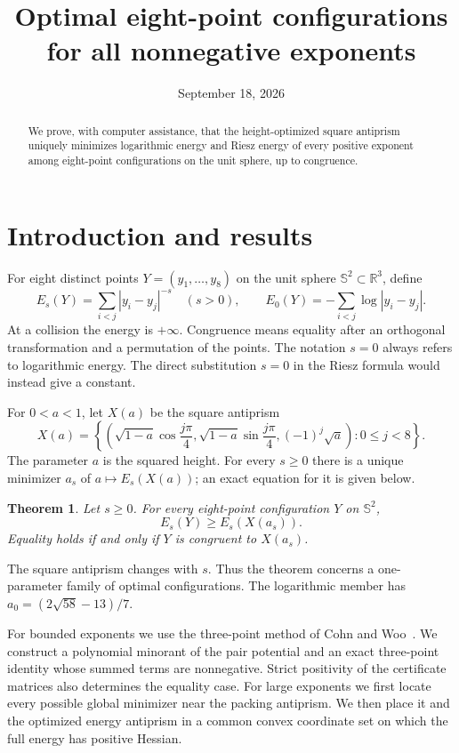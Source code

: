 \documentclass[12pt,reqno]{amsart}
\title[Optimal eight-point configurations]{Optimal eight-point configurations for all nonnegative exponents}
\author{}
\date{September 18, 2026}
\newtheorem{theorem}{Theorem}[section]
\theoremstyle{definition}
\newcommand{\R}{\mathbb R}
\newcommand{\Sph}{\mathbb S^2}
\numberwithin{equation}{section}
\begin{document}
\begin{abstract}
We prove, with computer assistance, that the height-optimized square
antiprism uniquely minimizes logarithmic energy and Riesz energy of every
positive exponent among eight-point configurations on the unit sphere,
up to congruence.
\end{abstract}
\maketitle

\section{Introduction and results}
For eight distinct points $Y=(y_1,\ldots,y_8)$ on the unit sphere
$\Sph\subset\R^3$, define
\begin{equation}\label{eq:energy}
 E_s(Y)=\sum_{i<j}|y_i-y_j|^{-s}\quad(s>0),\qquad
 E_0(Y)=-\sum_{i<j}\log|y_i-y_j|.
\end{equation}
At a collision the energy is $+\infty$. Congruence means equality after
an orthogonal transformation and a permutation of the points. The
notation $s=0$ always refers to logarithmic energy. The direct
substitution $s=0$ in the Riesz formula would instead give a constant.

For $0<a<1$, let $X(a)$ be the square antiprism
\begin{equation}\label{eq:family}
 X(a)=\left\{\left(\sqrt{1-a}\cos\frac{j\pi}{4},
 \sqrt{1-a}\sin\frac{j\pi}{4},(-1)^j\sqrt a\right):0\le j<8\right\}.
\end{equation}
The parameter $a$ is the squared height. For every $s\ge0$ there is a
unique minimizer $a_s$ of $a\mapsto E_s(X(a))$; an exact equation for it
is given below.

\begin{theorem}\label{thm:main}
Let $s\ge0$. For every eight-point configuration
$Y$ on $\Sph$,
\[
 E_s(Y)\ge E_s(X(a_s)).
\]
Equality holds if and only if $Y$ is congruent to $X(a_s)$.
\end{theorem}

The square antiprism changes with $s$. Thus the theorem concerns a
one-parameter family of optimal configurations. The logarithmic member
has $a_0=(2\sqrt{58}-13)/7$.

For bounded exponents we use the three-point method of Cohn and
Woo~\cite{CW}. We construct a polynomial minorant of the pair
potential and an exact three-point identity whose summed terms are
nonnegative. Strict positivity of the certificate matrices also
determines the equality case. For large exponents we first locate every
possible global minimizer near the packing antiprism. We then place it
and the optimized energy antiprism in a common convex coordinate set
on which the full energy has positive Hessian.
\end{document}
